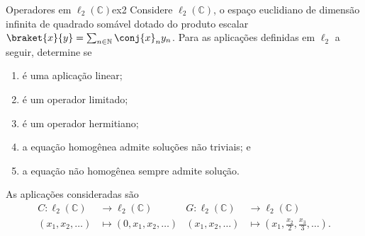 \begin{exercício}{Operadores em \(\ell_2(\mathbb{C})\)}{ex2}
   Considere \(\ell_2(\mathbb{C})\), o espaço euclidiano  de dimensão infinita de quadrado somável dotado do produto escalar \(\braket{x}{y} = \sum_{n \in \mathbb{N}} \conj{x}_n y_n\). Para as aplicações definidas em \(\ell_2\) a seguir, determine se
   \begin{enumerate}[label=(\alph*)]
      \item é uma aplicação linear;
      \item é um operador limitado;
      \item é um operador hermitiano;
      \item a equação homogênea admite soluções não triviais; e 
      \item a equação não homogênea sempre admite solução.
   \end{enumerate}
   As aplicações consideradas são
   \begin{align*}
      C : \ell_2(\mathbb{C}) &\to \ell_2(\mathbb{C})&
      G : \ell_2(\mathbb{C}) &\to \ell_2(\mathbb{C})\\
      (x_1, x_2, \dots) &\mapsto (0, x_1, x_2, \dots)&
      (x_1, x_2, \dots) &\mapsto \left(x_1, \frac{x_2}{2}, \frac{x_3}{3}, \dots\right).
   \end{align*}
\end{exercício}
